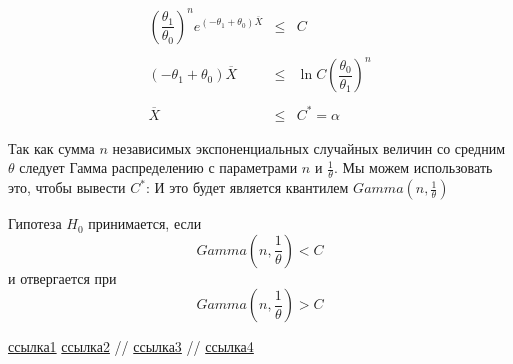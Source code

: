 \documentclass[a4paper,12pt, oneside]{book}
\begin{document}
$$
\begin{array}{rcl}
\left( \dfrac{\theta_1}{\theta_0}\right)^n e^{(-\theta_1 + \theta_0) \overline{X}} &\leq& C\\
\\
(-\theta_1 + \theta_0)\overline X &\leq& \ln C \left( \dfrac{\theta_0}{\theta_1}\right)^n  \\
\\
\overline{X} &\leq& C^* = \alpha
\end{array}
$$

Так как сумма $ n  $ независимых экспоненциальных случайных величин со средним $ \theta $ следует Гамма распределению с параметрами $ n $ и $ \frac{1}{\theta} $. Мы можем использовать это, чтобы вывести $ C^* $:
И это будет является квантилем $ Gamma(n, \frac{1}{\theta}) $

Гипотеза $ H_0 $ принимается, если 
$$
Gamma(n, \frac{1}{\theta}) < C
$$
и отвергается при 
$$
Gamma(n, \frac{1}{\theta}) > C
$$









\begin{thebibliography}{99}
	 \href{http://www.complexdoc.ru/ntdpdf/541018/prikladnaya_statistika_pravila_proverki_soglasiya_opytnogo_raspredeleniya.pdf}{ссылка1}
	  \href{https://www.statisticshowto.datasciencecentral.com/exponential-distribution/}{ссылка2}
	  // \href{http://www.ams.jhu.edu/~dan/550.435/notes/COURSENOTES435.pdf}{ссылка3}
	  // \href{http://www.obzh.ru/nad/4-3.html}{ссылка4}
\end{thebibliography}
\end{document}
